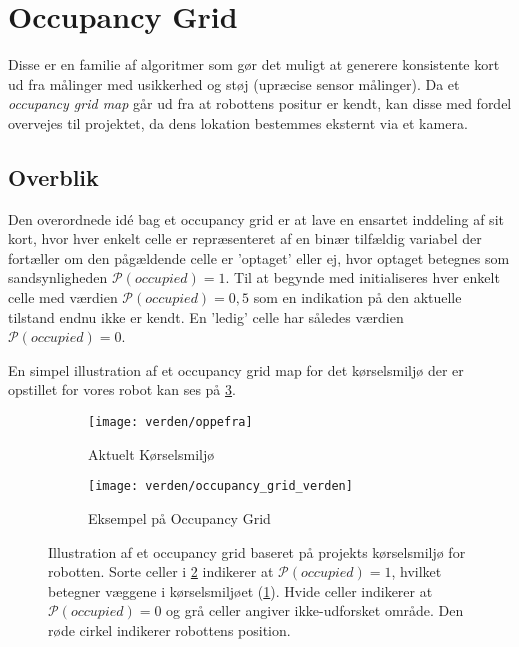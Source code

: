 \section{Occupancy Grid}\label{mapping:occupancy_grid}
Disse er en familie af algoritmer som gør det muligt at generere konsistente kort ud fra målinger med usikkerhed og støj (upræcise sensor målinger).
Da et \textit{occupancy grid map} går ud fra at robottens positur er kendt, kan disse med fordel overvejes til projektet, da dens lokation bestemmes eksternt via et kamera. \cite[s.~224]{probabilisticRobotics}

\subsection{Overblik}
Den overordnede idé bag et occupancy grid er at lave en ensartet inddeling af sit kort, hvor hver enkelt celle er repræsenteret af en binær tilfældig variabel der fortæller om den pågældende celle er 'optaget' eller ej, hvor optaget betegnes som sandsynligheden $\mathcal{P}(occupied) = 1$.
Til at begynde med initialiseres hver enkelt celle med værdien $\mathcal{P}(occupied) = 0,5$ som en indikation på den aktuelle tilstand endnu ikke er kendt.
En 'ledig' celle har således værdien $\mathcal{P}(occupied) = 0$.

En simpel illustration af et occupancy grid map for det kørselsmiljø der er opstillet for vores robot kan ses på \cref{map:approx_occupancy_grid}.

\begin{figure}[h] %
\centering
	\begin{subfigure}[b]{.45\textwidth}
	\centering
	\texttt{[image: verden/oppefra]}
	\caption{Aktuelt Kørselsmiljø}
	\label{map:world}
	\end{subfigure}
	\begin{subfigure}[b]{.45\textwidth}
	\centering
	\texttt{[image: verden/occupancy\_grid\_verden]}
	\caption{Eksempel på Occupancy Grid}
	\label{map:occupancy_grid}
	\end{subfigure}
\caption{Illustration af et occupancy grid baseret på projekts kørselsmiljø for robotten. Sorte celler i \cref{map:occupancy_grid} indikerer at $\mathcal{P}(occupied) = 1$, hvilket betegner væggene i kørselsmiljøet (\cref{map:world}). Hvide celler indikerer at $\mathcal{P}(occupied) = 0$ og grå celler angiver ikke-udforsket område. Den røde cirkel indikerer robottens position.}
\label{map:approx_occupancy_grid}
\end{figure}

